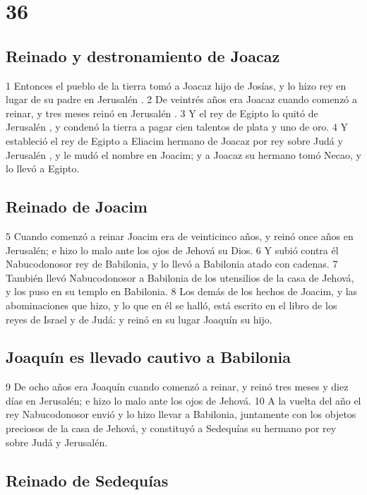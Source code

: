 \chapter{36}

\section*{Reinado y destronamiento de Joacaz }

 

1 Entonces el pueblo de la tierra tomó a Joacaz hijo de Josías, y lo hizo rey en lugar de su padre en Jerusalén .
2 De veintrés años era Joacaz cuando comenzó a reinar,  y tres meses reinó en Jerusalén .
3 Y el rey de Egipto lo quitó de Jerusalén , y condenó la tierra a pagar cien talentos de plata   y uno de oro.
4 Y estableció el rey de Egipto a Eliacim hermano de Joacaz por rey sobre Judá y Jerusalén , y le mudó el nombre en Joacim; y a Joacaz su hermano tomó Necao, y lo llevó a Egipto. 
\section*{Reinado de Joacim }


5 Cuando comenzó a reinar Joacim era de veinticinco años, y reinó once años en Jerusalén; e hizo lo malo ante los ojos de Jehová su Dios.
6 Y subió contra él Nabucodonosor rey de Babilonia, y lo llevó a Babilonia atado con cadenas.
7 También llevó Nabucodonosor a Babilonia de los utensilios de la casa de Jehová, y los puso en su templo en Babilonia.
8 Los demás de los hechos de Joacim, y las abominaciones que hizo, y lo que en él se halló, está escrito en el libro de los reyes de Israel y de Judá: y reinó en su lugar Joaquín su hijo.

\section*{Joaquín es llevado cautivo a Babilonia}

9 De ocho años era Joaquín cuando comenzó a reinar, y reinó tres meses y diez días en Jerusalén; e hizo lo malo ante los ojos de Jehová.
10 A la vuelta del año el rey Nabucodonosor envió y lo hizo llevar a Babilonia, juntamente con los objetos preciosos de la casa de Jehová, y constituyó a Sedequías su hermano por rey sobre Judá y Jerusalén. 
\section*{Reinado de Sedequías }

